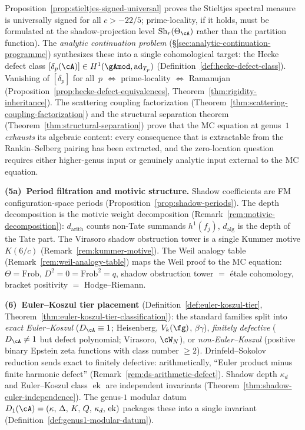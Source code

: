 Proposition~\ref{prop:stieltjes-signed-universal} proves the
Stieltjes spectral measure is universally signed for all $c > -22/5$;
prime-locality, if it holds, must be formulated at the
shadow-projection level $\operatorname{Sh}_r(\Theta_\cA)$ rather
than the partition function).
The \emph{analytic continuation problem}
(\S\ref{sec:analytic-continuation-programme}) synthesizes
these into a single cohomological target: the Hecke
defect class $[\delta_p(\cA)] \in H^1(\gAmod,
\mathrm{ad}_{T_p})$
(Definition~\ref{def:hecke-defect-class}).
Vanishing of $[\delta_p]$ for all~$p$
$\Leftrightarrow$ prime-locality
$\Leftrightarrow$ Ramanujan
(Proposition~\ref{prop:hecke-defect-equivalences},
Theorem~\ref{thm:rigidity-inheritance}).
The scattering coupling factorization
(Theorem~\ref{thm:scattering-coupling-factorization})
and the structural separation theorem
(Theorem~\ref{thm:structural-separation})
prove that the MC equation at genus~$1$ \emph{exhausts} its
algebraic content: every consequence that is extractable
from the Rankin--Selberg pairing has been extracted, and the
zero-location question requires either higher-genus input
or genuinely analytic input external to the MC equation.

\smallskip\noindent
\textbf{(5a)~Period filtration and motivic structure.}
Shadow coefficients are FM configuration-space periods
(Proposition~\ref{prop:shadow-periods}).
The depth decomposition is the motivic weight decomposition
(Remark~\ref{rem:motivic-decomposition}):
$d_{\mathrm{arith}}$ counts non-Tate summands $h^1(f_j)$,
$d_{\mathrm{alg}}$ is the depth of the Tate part.
The Virasoro shadow obstruction tower is a single Kummer motive $K(6/c)$
(Remark~\ref{rem:kummer-motive}).
The Weil analogy table
(Remark~\ref{rem:weil-analogy-table}) maps the Weil proof
to the MC equation: $\Theta = \mathrm{Frob}$,
$D^2=0 = \mathrm{Frob}^2=q$, shadow obstruction tower $=$ \'etale
cohomology, bracket positivity $=$ Hodge--Riemann.

\smallskip\noindent
\textbf{(6)~Euler--Koszul tier placement}
(Definition~\ref{def:euler-koszul-tier},
Theorem~\ref{thm:euler-koszul-tier-classification}):
the standard families split into \emph{exact Euler--Koszul}
($D_\cA \equiv 1$; Heisenberg, $V_k(\fg)$, $\beta\gamma$),
\emph{finitely defective} ($D_\cA \neq 1$ but defect
polynomial; Virasoro, $\cW_N$), or
\emph{non-Euler--Koszul} (positive binary Epstein zeta functions
with class number $\geq 2$).
Drinfeld--Sokolov reduction sends exact to finitely defective:
arithmetically, ``Euler product minus finite harmonic defect''
(Remark~\ref{rem:ds-arithmetic-defect}).
Shadow depth $\kappa_d$ and Euler--Koszul class
$\operatorname{ek}$ are independent invariants
(Theorem~\ref{thm:shadow-euler-independence}).
The genus-$1$ modular datum $D_1(\cA) = (\kappa,\,\Delta,\,K,\,Q,\,\kappa_d,\,\operatorname{ek})$ packages these into a single invariant (Definition~\ref{def:genus1-modular-datum}).

